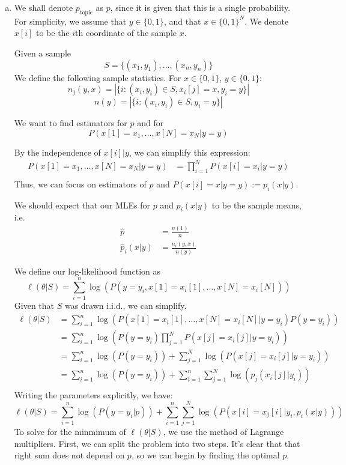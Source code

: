 \documentclass{amsart}
\theoremstyle{definition}
\begin{document}
\begin{enumerate}[(a)]
  \item 
    We shall denote $p_{\mathrm{topic}}$ as $p$, since it is given that this is a single probability. 
	For simplicity, we assume that $y \in \{0, 1\}$, and that $x \in \{0, 1\}^N$.
	We denote $x[i]$ to be the $i$th coordinate of the sample $x$. 

    Given a sample 
    \[
      S = \{(x_1,y_1), \ldots, (x_n, y_n)\}
    \]
    We define the following sample statistics. For $x \in \{0,1\}$, $y \in \{0,1\}$:
    \[n_j(y, x) = |\{i : (x_i, y_i)\in S, x_i[j] = x, y_i = y\}|\]
	\[n(y) = |\{i : (x_i, y_i)\in S, y_i = y\}|\]

	We want to find estimators for $p$ and for  
	\[P(x[1] = x_1, \ldots, x[N] = x_N | y = y)\]

	By the independence of $x[i] | y$, we can simplify this expression:
	\begin{align*}
		P(x[1] = x_1, \ldots, x[N] = x_N | y = y) &= \prod_{i=1}^N P(x[i] = x_i | y = y)\\
	\end{align*}
	Thus, we can focus on estimators of $p$ and $P(x[i] = x | y = y) := p_i(x|y)$.

    We should expect that our MLEs for $p$ and $p_i(x|y)$ to be the sample means, i.e. 
    \begin{align*}
      \hat{p} &= \frac{n(1)}{n}\\
      \hat{p}_i(x|y) &= \frac{n_i(y, x)}{n(y)}
    \end{align*}
	
	We define our log-likelihood function as
	\[\ell(\theta|S) = \sum_{i=1}^{n}\log(P(y = y_i, x[1] = x_i[1], \ldots, x[N] = x_i[N] )) \]
	Given that $S$ was drawn i.i.d., we can simplify.
	\begin{align*}
		\ell(\theta|S) &= \sum_{i=1}^{n}\log(P(x[1] = x_i[1], \ldots, x[N] = x_i[N] | y = y_i)P(y = y_i))  \\
		&= \sum_{i=1}^{n}\log(P(y=y_i)\prod_{j=1}^{N} P(x[j] = x_i[j]|y = y_i))\\
	 	&= \sum_{i=1}^{n}\log(P(y = y_i)) + \sum_{j=1}^{N} \log(P(x[j] = x_i[j]|y = y_i))\\
		&= \sum_{i=1}^{n}\log(P(y = y_i)) + \sum_{i=1}^{n}\sum_{j=1}^{N} \log(p_j(x_i[j]|y_i))\\
	\end{align*}
	Writing the parameters explicitly, we have:
	\[
	\ell(\theta|S) = \sum_{i=1}^{n}\log(P(y = y_i|p)) + \sum_{i=1}^{n}\sum_{j=1}^{N} \log(P(x[i] = x_j[i]| y_i, p_i(x|y)))
	\]
	To solve for the minmimum of $\ell(\theta|S)$, we use the method of Lagrange multipliers. 
	First, we can split the problem into two steps. It's clear that that right sum does not depend on $p$, 
	so we can begin by finding the optimal $p$.


\end{enumerate}
\end{document}
